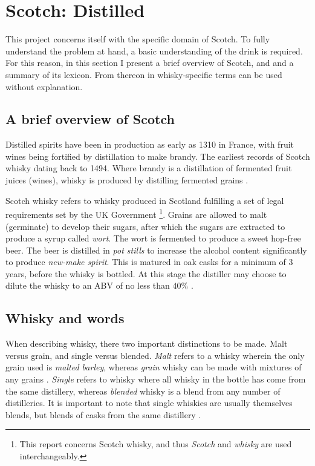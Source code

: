 \section{Scotch: Distilled}\label{sec:whisky}
This project concerns itself with the specific domain of Scotch. To fully understand the problem at hand, a basic
understanding of the drink is required.  For this reason, in this section I present a brief overview of Scotch, and 
and a summary of its lexicon. From thereon in whisky-specific terms can be used without explanation.

\subsection{A brief overview of Scotch}
Distilled spirits have been in production as early as 1310 in France, with fruit wines being fortified by distillation
to make brandy. The earliest records of Scotch whisky dating back to 1494. Where brandy is a distillation of 
fermented fruit juices (wines), whisky is produced by distilling fermented grains \cite{Jacques2003, Pyke1965}.

Scotch whisky refers to whisky produced in Scotland fulfilling a set of legal requirements set by the UK Government 
\cite{legislation.gov.uk_2009}\footnote{This report concerns Scotch whisky, and thus \emph{Scotch} and \emph{whisky} 
are used interchangeably.}.  Grains are allowed to malt (germinate) to develop their sugars, after which the sugars are
extracted to produce a syrup called \emph{wort}.  The wort is fermented to produce a sweet hop-free beer.  The beer is
distilled in \emph{pot stills} to increase the alcohol content significantly to produce \emph{new-make spirit}. This
is matured in oak casks for a minimum of 3 years, before the whisky is bottled.  At this stage the distiller may choose
to dilute the whisky to an ABV of no less than $40\%$ \cite{Jacques2003, Pyke1965}.

\subsection{Whisky and words}
When describing whisky, there two important distinctions to be made.  Malt versus grain, and single versus blended.  
\emph{Malt} refers to a whisky wherein the only grain used is \emph{malted barley}, whereas \emph{grain} whisky can 
be made with mixtures of any grains \cite{Valaer1940}.  \emph{Single} refers to whisky where all whisky in the bottle
has come from the same distillery, whereas \emph{blended} whisky is a blend from any number of distilleries.  It is
important to note that single whiskies are usually themselves blends, but blends of casks from the same distillery 
\cite{Smith2017}.

